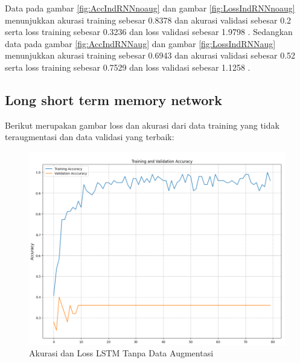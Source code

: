 Data pada gambar \ref{fig:AccIndRNNnoaug} dan gambar \ref{fig:LossIndRNNnoaug} menunjukkan akurasi training
sebesar 0.8378 dan akurasi validasi sebesar 0.2 serta loss training sebesar 0.3236
dan loss validasi sebesar 1.9798 . Sedangkan data pada gambar \ref{fig:AccIndRNNaug} dan gambar \ref{fig:LossIndRNNaug}
menunjukkan akurasi training sebesar 0.6943 dan akurasi validasi sebesar 0.52 serta
loss training sebesar 0.7529 dan loss validasi sebesar 1.1258 .

\newpage
\subsection{Long short term memory network}
Berikut merupakan gambar loss dan akurasi dari data training yang tidak teraugmentasi dan
data validasi yang terbaik:

\begin{figure} [ht] \centering
  \includegraphics[scale=0.55]{gambar/AccLSTMnoAug.png}
  \caption{Akurasi dan Loss LSTM Tanpa Data Augmentasi}
  \label{fig:AccLSTMnoaug}
\end{figure}

